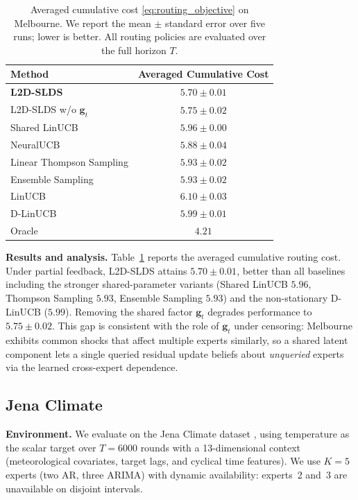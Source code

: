 \begin{table}[ht]
\centering
\small
\setlength{\tabcolsep}{4pt}
\caption{Averaged cumulative cost \eqref{eq:routing_objective} on Melbourne.
We report the mean $\pm$ standard error over five runs; lower is better.
All routing policies are evaluated over the full horizon \(T\).}
\label{tab:exp_avg_costs_melbourne}
\begin{tabular}{@{}lc@{}}
\toprule
Method & Averaged Cumulative Cost  \\
\midrule
\textbf{L2D-SLDS} & \(\mathbf{5.70 \pm 0.01}\)  \\
L2D-SLDS w/o \(\mathbf{g}_t\) & \(5.75 \pm 0.02\) \\
\midrule
Shared LinUCB & \(5.96 \pm 0.00\)  \\
NeuralUCB & \(5.88 \pm 0.04\)  \\
Linear Thompson Sampling & \(5.93 \pm 0.02\) \\
Ensemble Sampling & \(5.93 \pm 0.02\) \\
LinUCB & \(6.10 \pm 0.03\)  \\
D-LinUCB & \(5.99 \pm 0.01\) \\
\midrule
Oracle & \(4.21\)  \\
\bottomrule
\end{tabular}
\end{table}

\textbf{Results and analysis.}
Table~\ref{tab:exp_avg_costs_melbourne} reports the averaged cumulative routing cost. Under partial feedback, L2D-SLDS attains
\(5.70 \pm 0.01\), better than all baselines including the stronger shared-parameter variants
(Shared LinUCB \(5.96\), Thompson Sampling \(5.93\), Ensemble Sampling \(5.93\)) and the non-stationary
D-LinUCB (\(5.99\)). Removing the shared factor
\(\mathbf{g}_t\) degrades performance to \(5.75 \pm 0.02\).
This gap is consistent with the role of \(\mathbf{g}_t\) under censoring: Melbourne exhibits common shocks
that affect multiple experts similarly, so a shared latent component lets a single queried residual
update beliefs about \emph{unqueried} experts via the learned cross-expert dependence.

\subsection{Jena Climate}
\label{sec:exp_jena}

\textbf{Environment.}
We evaluate on the Jena Climate dataset \citep{jena_climate}, using temperature as the scalar target
over \(T=6000\) rounds with a 13-dimensional context (meteorological covariates, target lags, and
cyclical time features). We use \(K=5\) experts (two AR, three ARIMA) with dynamic availability:
experts~2 and~3 are unavailable on disjoint intervals.

